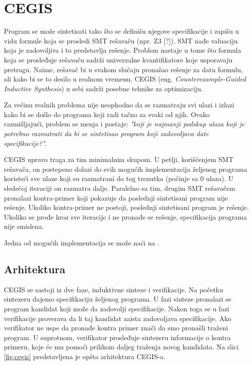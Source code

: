\section{CEGIS}
\label{sec:cegis}

Program se može sintetisati tako što se definišu njegove specifikacije i zapišu u vidu formule koja se prosledi SMT rešavaču (npr. Z3 [?]). SMT nađe valuaciju koja je zadovoljiva i to predstavlja rešenje. Problem nastaje u tome što formula koja se prosleđuje rešavaču sadrži univerzalne kvantifikatore koje usporavaju pretragu. Naime, rešavač bi u svakom slučaju pronašao rešenje za datu formulu, ali kako bi se to desilo u realnom vremenu, CEGIS (eng. \emph{Counterexample-Guided Inductive Synthesis}) u sebi sadrži posebne tehnike za optimizaciju.

Za većinu realnih problema nije neophodno da se razmatraju svi ulazi i izlazi kako bi se došlo do programa koji radi tačno za svaki od njih. Ovako razmišljajući, problem se menja i postaje: \emph{"koji je najmanji podskup ulaza koji je potrebno razmatrati da bi se sintetisao program koji zadovoljava date specifikacije?"}.

CEGIS upravo traga za tim minimalnim skupom. U petlji, korišćenjem SMT rešavača, on postepeno dolazi do svih mogućih implementacija že\-lje\-nog programa koristeći sve ulaze koji su razmatrani do tog trenutka (počinje sa 0 ulaza). U sledećoj iteraciji on razmatra dalje. Paralelno sa tim, drugim SMT rešavačem pronalazi kontra-primer koji pokazuje da poslednji sintetisani program nije rešenje. Ukoliko kontra-primer ne postoji, poslednji sintetisani program je rešenje. Ukoliko se prođe kroz sve iteracije i ne pronađe se rešenje, specifikacija programa nije smislena.

Jedna od mogućih implementacija se može naći na \cite{CEGISimpl}.


\subsection{Arhitektura}
\label{subsec:Arhitektura}

CEGIS se sastoji iz dve faze, induktivne sinteze i verifikacije. Na početku sintezeru dajemo specifikaciju željenog programa. U fazi sinteze pronalazi se program kandidat koji može da zadovolji specifikacije. Nakon toga se u fazi verifikacije proverava da li taj kandidat zaista zadovoljava specifikacije. Ako verifikator ne uspe da pronađe kontra primer znači da smo pronašli traženi program. U suprotnom, verifikator prosleđuje sintezeru informacije o kontra primeru, koje će mu pomoći prilikom daljeg traženja novog kandidata. Na slici \ref{fig:cegis} predstavljena je opšta arhitektura CEGIS-a.

